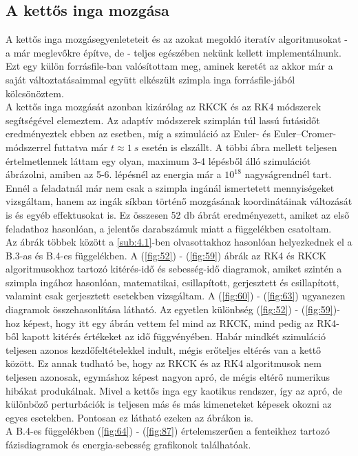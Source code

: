 \begin{multicols}{2}
\subsection{A kettős inga mozgása} \label{sub:4.2}
A kettős inga mozgásegyenleteteit és az azokat megoldó iteratív algoritmusokat - a már meglevőkre építve, de - teljes egészében nekünk kellett implementálnunk. Ezt egy külön forrásfile-ban valósítottam meg, aminek keretét az akkor már a saját változtatásaimmal együtt elkészült szimpla inga forrásfile-jából kölcsönöztem. \\
A kettős inga mozgását azonban kizárólag az RKCK és az RK4 módszerek segítségével elemeztem. Az adaptív módszerek szimplán túl lassú futásidőt eredményeztek ebben az esetben, míg a szimuláció az Euler- és Euler--Cromer-módszerrel futtatva már $t \approx 1\ s$ esetén is elszállt. A többi ábra mellett teljesen értelmetlennek láttam egy olyan, maximum 3-4 lépésből álló szimulációt ábrázolni, amiben az 5-6. lépésnél az energia már a $10^{18}$ nagyságrendnél tart. \\
Ennél a feladatnál már nem csak a szimpla ingánál ismertetett mennyiségeket vizsgáltam, hanem az ingák síkban történő mozgásának koordinátáinak változását is és egyéb effektusokat is. Ez összesen 52 db ábrát eredményezett, amiket az első feladathoz hasonlóan, a jelentős darabszámuk miatt a  függelékben csatoltam. \\
Az ábrák többek között a \ref{sub:4.1}-ben olvasottakhoz hasonlóan helyezkednek el a B.3-as és B.4-es függelékben. A (\ref{fig:52}) - (\ref{fig:59}) ábrák az RK4 és RKCK algoritmusokhoz tartozó kitérés-idő és sebesség-idő diagramok, amiket szintén a szimpla ingához hasonlóan, matematikai, csillapított, gerjesztett és csillapított, valamint csak gerjesztett esetekben vizsgáltam. A (\ref{fig:60}) - (\ref{fig:63}) ugyanezen diagramok összehasonlítása látható. Az egyetlen különbség (\ref{fig:52}) - (\ref{fig:59})-hoz képest, hogy itt egy ábrán vettem fel mind az RKCK, mind pedig az RK4-ből kapott kitérés értékeket az idő függvényében. Habár mindkét szimuláció teljesen azonos kezdőfeltételekkel indult, mégis erőteljes eltérés van a kettő között. Ez annak tudható be, hogy az RKCK és az RK4 algoritmusok nem teljesen azonosak, egymáshoz képest nagyon apró, de mégis eltérő numerikus hibákat produkálnak. Mivel a kettős inga egy kaotikus rendszer, így az apró, de különböző perturbációk is teljesen más és más kimeneteket képesek okozni az egyes esetekben. Pontosan ez látható ezeken az ábrákon is. \\
A B.4-es függelékben (\ref{fig:64}) - (\ref{fig:87}) értelemszerűen a fenteikhez tartozó fázisdiagramok és energia-sebesség grafikonok találhatóak. \\

\end{multicols}
